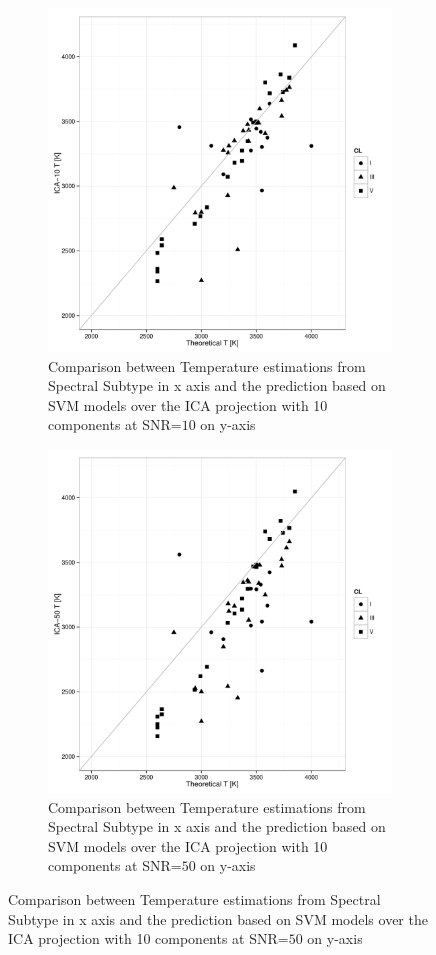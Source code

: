 {\begin {figure}
 \centering
 \begin{subfigure}{.85\textwidth}
  \centering
  \includegraphics[width=12cm]{figs/T_ICA_10_SpT.pdf}
  \caption{Comparison between Temperature estimations from Spectral Subtype 
 in x axis and the prediction based on SVM models over the ICA projection 
 with 10 components at SNR=$10$ on y-axis}
 \label{fig:T_ICA_10_SpT}
 \end{subfigure}
  \begin{subfigure}{.85\textwidth}
   \centering
  \includegraphics[width=12cm]{figs/T_ICA_50_SpT.pdf}
  \caption{Comparison between Temperature estimations from Spectral Subtype 
 in x axis and the prediction based on SVM models over the ICA projection 
 with 10 components at SNR=$50$ on y-axis}
 \label{fig:T_ICA_10_SpT}  
  \end{subfigure}
 \label{fig:t_ica_1050_SpT}
\end {figure}

}
